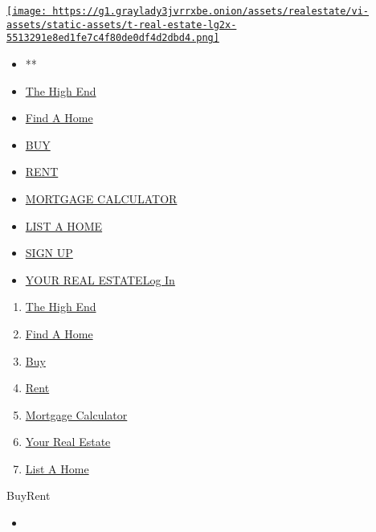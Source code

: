 \href{/section/realestate}{\texttt{[image: https://g1.graylady3jvrrxbe.onion/assets/realestate/vi-assets/static-assets/t-real-estate-lg2x-5513291e8ed1fe7c4f80de0df4d2dbd4.png]}}

\begin{itemize}
\tightlist
\item
  **
\item
  \href{/real-estate/the-high-end}{The High End}
\item
  \href{/real-estate/find-a-home}{Find A Home}
\item
  \href{/real-estate/homes-for-sale}{BUY}
\item
  \href{/real-estate/homes-for-rent}{RENT}
\item
  \href{/real-estate/mortgage-calculator}{MORTGAGE CALCULATOR}
\item
  \href{https://nytimesads.gtspayments.com}{LIST A HOME}
\item
  \href{https://myaccount.nytimes3xbfgragh.onion/auth/register?client_id=real.estate.ui\&display=control\&redirect_uri=\%2Freal-estate\%2Fhomes-for-rent\%3F\&response_type=cookie}{SIGN
  UP}
\item
  \href{https://myaccount.nytimes3xbfgragh.onion/auth/login?client_id=real.estate.ui\&display=control\&redirect_uri=\%2Freal-estate\%2Fhomes-for-rent\%3F\&response_type=cookie}{YOUR
  REAL ESTATELog In}
\end{itemize}

\begin{enumerate}
\def\labelenumi{\arabic{enumi}.}
\tightlist
\item
  \href{/real-estate/the-high-end}{The High End}
\item
  \href{/real-estate/find-a-home}{Find A Home}
\item
  \href{/real-estate/homes-for-sale}{Buy}
\item
  \href{/real-estate/homes-for-rent}{Rent}
\item
  \href{/real-estate/mortgage-calculator}{Mortgage Calculator}
\item
  \href{/real-estate/my-real-estate}{Your Real Estate}
\item
  \href{https://nytimesads.gtspayments.com/}{List A Home}
\end{enumerate}

BuyRent

\begin{itemize}
\item
\end{itemize}

